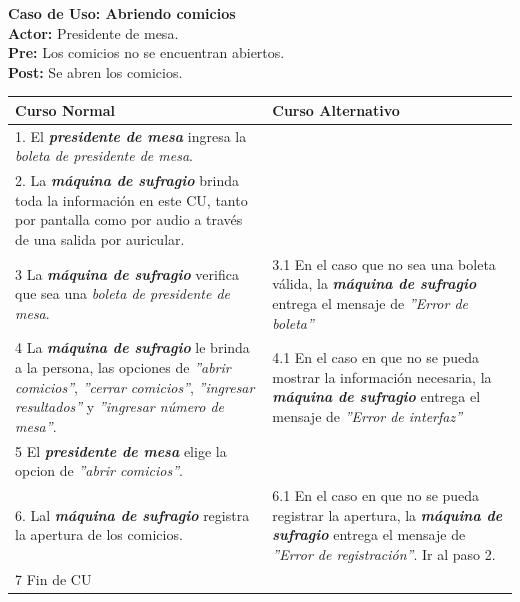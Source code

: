\documentclass[spanish, 10pt,a4paper]{article}
\numberwithin{equation}{section} %
\begin{document}
\newpage
\noindent\textbf{Caso de Uso: Abriendo comicios}\\
\textbf{Actor: } Presidente de mesa.\\
\textbf{Pre: } Los comicios no se encuentran abiertos.\\
\textbf{Post: } Se abren los comicios.\\
\begin{table}[H]
  \centering
\bgroup
\def\arraystretch{1.3}
  \begin{tabular}{p{9cm} | p{7cm}}
    \hline
    Curso Normal & Curso Alternativo \\
    \hline
    \hline    
    1. El \textbf{\textit{presidente de mesa}} ingresa la \textit{boleta de presidente de mesa}. 
    & \\
    
    \hline
    2. La \textbf{\textit{máquina de sufragio}} brinda toda la información en este CU, tanto por pantalla como por audio a través de una salida por auricular.
    &
    \\
    
    \hline
    3 La \textbf{\textit{máquina de sufragio}} verifica que sea una \textit{boleta de presidente de mesa}.
    & 
    3.1 En el caso que no sea una boleta válida, la \textbf{\textit{máquina de sufragio}} entrega el mensaje de \textit{''Error de boleta''}
    \\
    
    \hline
    4 La \textbf{\textit{máquina de sufragio}} le brinda a la persona, las opciones de \textit{''abrir comicios''}, \textit{''cerrar comicios''}, \textit{''ingresar resultados''} y \textit{''ingresar número de mesa''}.
    & 
    4.1 En el caso en que no se pueda mostrar la información necesaria, la \textbf{\textit{máquina de sufragio}} entrega el mensaje de \textit{''Error de interfaz''}
    \\
    
    \hline
    5 El \textbf{\textit{presidente de mesa}} elige la opcion de \textit{''abrir comicios''}.
    & \\
    
    \hline
    6. Lal \textbf{\textit{máquina de sufragio}} registra la apertura de los comicios.
    &
    6.1 En el caso en que no se pueda registrar la apertura, la \textbf{\textit{máquina de sufragio}} entrega el mensaje de \textit{''Error de registración''}. Ir al paso 2.
    \\
    
    \hline
    7 Fin de CU
    & \\
    \hline
  \end{tabular}
\egroup
\end{table}
\end{document}
